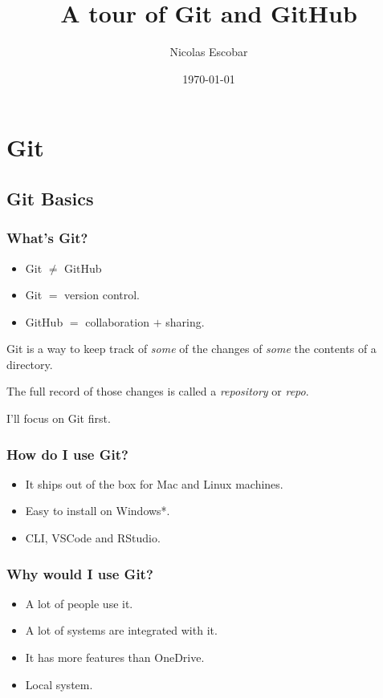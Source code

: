 \documentclass{beamer}
\title{A tour of Git and GitHub}
\author{Nicolas Escobar}
\date{\today}
\begin{document}
\begin{frame}
    \titlepage
\end{frame}

\section{Git}

\subsection{Git Basics}

\begin{frame}
    \frametitle{What's Git?}
    \begin{itemize}
        \item Git $\neq$ GitHub
        \item Git $=$ version control.
        \item GitHub $=$ collaboration $+$ sharing.
    \end{itemize}

    Git is a way to keep track of \textit{some} of the changes of \textit{some} the contents of a directory. 
    
    The full record of those changes is called a \textit{repository} or \textit{repo}. 

    I'll focus on Git first. 
\end{frame}

\begin{frame}
    \frametitle{How do I use Git?}
    \begin{itemize}
        \item It ships out of the box for Mac and Linux machines. 
        \item Easy to install on Windows*.
        \item CLI, VSCode and RStudio. 
    \end{itemize}
\end{frame} 

\begin{frame}
    \frametitle{Why would I use Git?}
    \begin{itemize}
        \item A lot of people use it. 
        \item A lot of systems are integrated with it. 
        \item It has more features than OneDrive.
        \item Local system.
    \end{itemize}
\end{frame}
\end{document}
